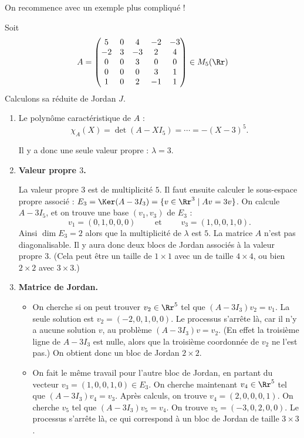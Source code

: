 \documentclass[12pt, class=report,crop=false]{standalone}
\begin{document}
\bigskip

On recommence avec un exemple plus compliqué !

\begin{exemple}
Soit 
$$A = \begin{pmatrix}
5 & 0 & 4 & -2 & -3 \\
-2 & 3 & -3 & 2 & 4 \\
0 & 0 & 3 & 0 & 0 \\
0 & 0 & 0 & 3 & 1 \\
1 & 0 & 2 & -1 & 1
\end{pmatrix}
\in M_5(\Rr)$$
Calculons sa réduite de Jordan $J$.

\begin{enumerate}
  \item Le polynôme caractéristique de $A$ :
  $$\chi_A(X) = \det(A-XI_5) = \cdots = -(X-3)^5.$$
  
  Il y a donc une seule valeur propre : $\lambda = 3$.
  
  \item \textbf{Valeur propre $3$.}
  
  La valeur propre $3$ est de multiplicité $5$. 
  Il faut ensuite calculer le sous-espace propre associé : 
  $E_{3} = \Ker(A-3I_3) = \{ v \in \Rr^3 \mid Av = 3v\}$.
  On calcule $A-3I_5$, et on trouve une base $(v_1,v_3)$ de $E_3$ :
  $$v_1 =(0,1,0,0,0) \qquad \text{ et } \qquad  v_3 = (1,0,0,1,0).$$
  Ainsi $\dim E_3 = 2$ alors que la multiplicité de $\lambda$ est $5$. La matrice $A$ n'est pas diagonalisable. 
  Il y aura donc deux blocs de Jordan associés à la valeur propre $3$. (Cela peut être un taille de $1\times1$ avec un de taille $4\times 4$, ou bien $2\times 2$ avec $3\times 3$.)
  
  
  \item \textbf{Matrice de Jordan.}

  \begin{itemize}
    \item On cherche si on peut trouver $v_2 \in \Rr^5$ tel que $(A-3I_3)v_2 = v_1$.
  La seule solution est $v_2 = (-2,0,1,0,0)$.
  Le processus s'arrête là, car il n'y a aucune solution $v$, au problème $(A-3I_3)v=v_2$.
  (En effet la troisième ligne de $A-3I_3$ est nulle, alors que la troisième coordonnée de $v_2$ ne l'est pas.) On obtient donc un bloc de Jordan $2\times2$.  
  
    \item On fait le même travail pour l'autre bloc de Jordan, en partant du
    vecteur $v_3 =  (1,0,0,1,0) \in E_3$.    
     On cherche maintenant $v_4 \in \Rr^5$ tel que $(A-3I_3)v_4 = v_3$.
    Après calculs, on trouve $v_4 = (2, 0, 0, 0, 1)$. 
    On cherche $v_5$ tel que $(A-3I_3)v_5 = v_4$. On trouve
    $v_5 = (-3, 0, 2, 0, 0)$. Le processus s'arrête là, ce qui correspond à un bloc de Jordan de taille 
    $3\times 3$.
    

\end{itemize}
\end{enumerate}
\end{exemple}
\end{document}
